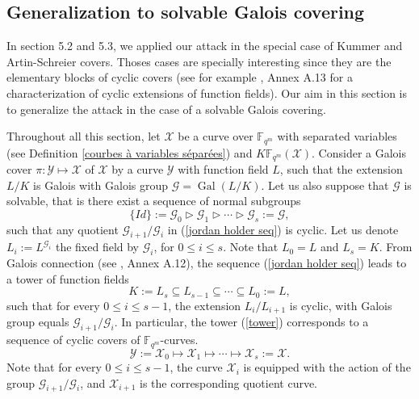 \documentclass[10pt]{article}
\newcommand{\s}{\vspace{0.3cm}}
\newcommand{\fqm}{\mathbb{F}_{q^m}}
\newcommand{\su}{\subseteq}
\newcommand{\X}{\mathcal{X}}
\newcommand{\Y}{\mathcal{Y}}
\newcommand{\G}{\mathcal{G}}
\newcommand{\Gal}{\operatorname{Gal}}
\begin{document}
\s

\subsection{Generalization to solvable Galois covering}

\s

In section 5.2 and 5.3, we applied our attack in the special case of Kummer and Artin-Schreier covers. Thoses cases are specially interesting since they are the elementary blocks of cyclic covers (see for example \cite{Sti}, Annex A.13 for a characterization of cyclic extensions of function fields). Our aim in this section is to generalize the attack in the case of a solvable Galois covering.

Throughout all this section, let $\X$ be a curve over $\fqm$ with separated variables (see Definition \ref{courbes à variables séparées}) and $K\fqm(\X)$. Consider a Galois cover $\pi : \Y \longmapsto \X$ of $\X$ by a curve $\Y$ with function field $L$, such that the extension $L/K$ is Galois with Galois group $\G = \Gal  (L/K)$. Let us also suppose that $\G$ is solvable, that is there exist a sequence of normal subgroups 
\begin{equation} \label{jordan holder seq}
 \{Id\} := \G_0 \triangleright \G_1 \triangleright \cdots \triangleright \G_s := \G, 
\end{equation} 
such that any quotient $\G_{i+1}/\G_i$ in (\ref{jordan holder seq}) is cyclic. Let us denote $L_i := L^{\G_i}$ the fixed field by $\G_i$, for $0 \leq i \leq s$. Note that $L_0=L$ and $L_s=K$. From Galois connection (see \cite{Sti}, Annex A.12), the sequence (\ref{jordan holder seq}) leads to a tower of function fields
\begin{equation} \label{tower}
K := L_s \su L_{s-1} \su \cdots \su L_0 := L,
\end{equation}
such that for every $0\leq i\leq s-1$, the extension $L_i/L_{i+1}$ is cyclic, with Galois group equals $\G_{i+1}/\G_i$. In particular, the tower (\ref{tower}) corresponds to a sequence of cyclic covers of $\fqm$-curves.
\begin{equation} \label{curve tower}
\Y := \X_0 \longmapsto \X_1 \longmapsto \cdots \longmapsto \X_s := \X.
\end{equation}
Note that for every $0 \leq i \leq s-1$, the curve $\X_i$ is equipped with the action of the group $\G_{i+1}/\G_i$, and $\X_{i+1}$ is the corresponding quotient curve. 
\end{document}
